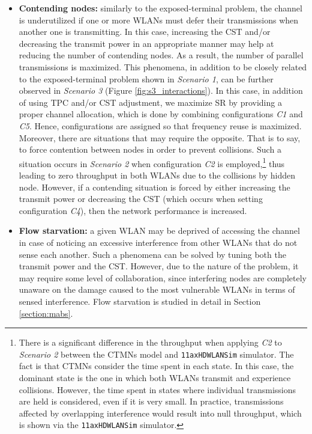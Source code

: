\documentclass{article}
\begin{document}
\begin{itemize}
	\item \textbf{Contending nodes:} similarly to the exposed-terminal problem, the channel is underutilized if one or more WLANs must defer their transmissions when another one is transmitting. In this case, increasing the CST and/or decreasing the transmit power in an appropriate manner may help at reducing the number of contending nodes. As a result, the number of parallel transmissions is maximized. This phenomena, in addition to be closely related to the exposed-terminal problem shown in \emph{Scenario 1}, can be further observed in \emph{Scenario 3} (Figure \ref{fig:s3_interactions}). In this case, in addition of using TPC and/or CST adjustment, we maximize SR by providing a proper channel allocation, which is done by combining configurations \emph{C1} and \emph{C5}. Hence, configurations are assigned so that frequency reuse is maximized. Moreover, there are situations that may require the opposite. That is to say, to force contention between nodes in order to prevent collisions. Such a situation occurs in \emph{Scenario 2} when configuration \emph{C2} is employed,\footnote{There is a significant difference in the throughput when applying \emph{C2} to \emph{Scenario 2} between the CTMNs model and \texttt{11axHDWLANSim} simulator. The fact is that CTMNs consider the time spent in each state. In this case, the dominant state is the one in which both WLANs transmit and experience collisions. However, the time spent in states where individual transmissions are held is considered, even if it is very small. In practice, transmissions affected by overlapping interference would result into null throughput, which is shown via the \texttt{11axHDWLANSim} simulator.} thus leading to zero throughput in both WLANs due to the collisions by hidden node. However, if a contending situation is forced by either increasing the transmit power or decreasing the CST (which occurs when setting configuration \emph{C4}), then the network performance is increased. 		
	\item \textbf{Flow starvation:} a given WLAN may be deprived of accessing the channel in case of noticing an excessive interference from other WLANs that do not sense each another. Such a phenomena can be solved by tuning both the transmit power and the CST. However, due to the nature of the problem, it may require some level of collaboration, since interfering nodes are completely unaware on the damage caused to the most vulnerable WLANs in terms of sensed interference. Flow starvation is studied in detail in Section \ref{section:mabs}.

\end{itemize}
\end{document}
